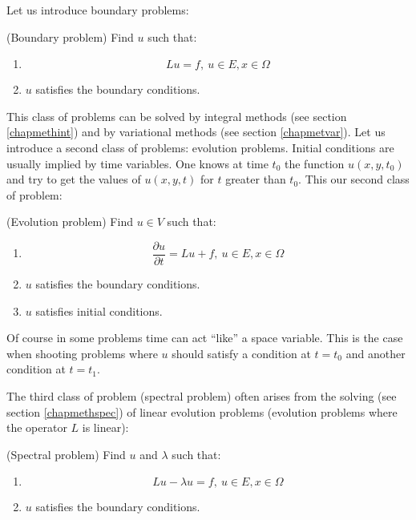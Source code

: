 \documentclass[12pt]{book}
\begin{document}
Let us introduce boundary problems:
\begin{prob}\label{proeq}(Boundary problem) 
Find $u$ such that:
\begin{enumerate}
\item 
\begin{equation}
Lu=f,\ u\in E, x\in\Omega
\end{equation}
\item $u$ satisfies the boundary conditions.
\end{enumerate}
\end{prob}
This class of problems can be solved by integral methods (see section
\ref{chapmethint}) and by variational methods (see section
\ref{chapmetvar}).
Let us introduce a second class of problems: evolution problems.
Initial conditions are usually implied by time variables. One knows at time
$t_0$ the function $u(x,y,t_0)$ and try to get the values of $u(x,y,t)$ for
$t$ greater than $t_0$.
This our second class of problem:
\begin{prob}\label{probevollin}(Evolution problem)
Find $u\in V$ such that:
\begin{enumerate}
\item 
\begin{equation}\label{eqevollinspec}
\frac{\partial u}{\partial t}=Lu+f,\ u\in E, x\in\Omega
\end{equation}
\item $u$ satisfies the boundary conditions.
\item $u$ satisfies initial conditions.
\end{enumerate}
\end{prob}

Of course in some problems time can act ``like'' a space variable. This is the
case when shooting problems where $u$ should satisfy a condition at $t=t_0$
and another condition at $t=t_1$.

The third class of problem (spectral problem) often arises from the solving
(see section 
\ref{chapmethspec}) of linear evolution problems (evolution problems where the
operator $L$ is linear):

\begin{prob}\label{prospec1} (Spectral problem)
Find  $u$ and $\lambda$ such that:
\begin{enumerate}
\item 
\begin{equation}
Lu-\lambda u=f,\ u\in E, x\in\Omega
\end{equation}
\item  $u$ satisfies the boundary conditions.
\end{enumerate}
\end{prob}
\end{document}
